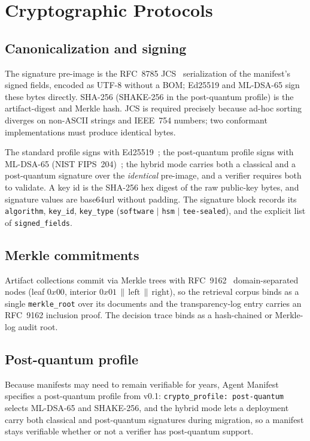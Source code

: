 \section{Cryptographic Protocols}
\label{sec:crypto}

\subsection{Canonicalization and signing}

The signature pre-image is the RFC~8785 JCS~\citep{jcs8785} serialization of the
manifest's signed fields, encoded as UTF-8 without a BOM; Ed25519 and ML-DSA-65 sign
these bytes directly. SHA-256 (SHAKE-256 in the post-quantum profile) is the
artifact-digest and Merkle hash. JCS is required precisely
because ad-hoc sorting diverges on non-ASCII strings and IEEE~754 numbers; two
conformant implementations must produce identical bytes.

The standard profile signs with Ed25519~\citep{eddsa8032}; the post-quantum profile
signs with ML-DSA-65 (NIST FIPS~204)~\citep{mldsa204}; the hybrid mode carries both a
classical and a post-quantum signature over the \emph{identical} pre-image, and a
verifier requires both to validate. A key id is the SHA-256 hex digest of the raw
public-key bytes, and signature values are base64url without padding. The signature
block records its \texttt{algorithm}, \texttt{key\_id}, \texttt{key\_type}
(\texttt{software} $|$ \texttt{hsm} $|$ \texttt{tee-sealed}), and the explicit list of
\texttt{signed\_fields}.

\subsection{Merkle commitments}

Artifact collections commit via Merkle trees with RFC~9162~\citep{ct9162}
domain-separated nodes (leaf $0x00$, interior $0x01 \,\|\, \text{left} \,\|\,
\text{right}$), so the retrieval corpus binds as a single \texttt{merkle\_root} over
its documents and the transparency-log entry carries an RFC~9162 inclusion proof. The
decision trace binds as a hash-chained or Merkle-log audit root.

\subsection{Post-quantum profile}

Because manifests may need to remain verifiable for years, Agent Manifest specifies a
post-quantum profile from v0.1: \texttt{crypto\_profile: post-quantum} selects
ML-DSA-65 and SHAKE-256, and the hybrid mode lets a deployment carry both classical
and post-quantum signatures during migration, so a manifest stays verifiable whether
or not a verifier has post-quantum support.
